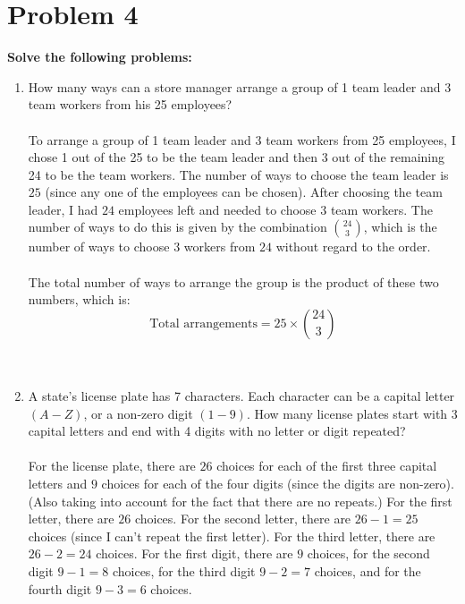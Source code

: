 \documentclass{amsart}
\theoremstyle{definition}
\theoremstyle{Exercise}
\theoremstyle{remark}
\theoremstyle{rule}
\numberwithin{equation}{section}
\begin{document}
  \section*{Problem 4}
  {\bf Solve the following problems:}
  \begin{enumerate}[label=(\alph*)]
    \item How many ways can a store manager arrange a group of 1 team leader and 3 team workers from his 25 employees?
\\\\
To arrange a group of 1 team leader and 3 team workers from 25 employees, I chose 1 out of the 25 to be the team leader and then 3 out of the remaining 24 to be the team workers. The number of ways to choose the team leader is \(25\) (since any one of the employees can be chosen). After choosing the team leader, I had \(24\) employees left and needed to choose \(3\) team workers. The number of ways to do this is given by the combination \(24 \choose 3\), which is the number of ways to choose \(3\) workers from \(24\) without regard to the order.
\\\\
The total number of ways to arrange the group is the product of these two numbers, which is:
\[
\text{Total arrangements} = 25 \times \binom{24}{3}
\]
\\\\
    \item A state’s license plate has 7 characters. Each character can be a capital letter $(A-Z)$, or a non-zero digit $(1-9)$. How many license plates start with 3 capital letters and end with 4 digits with no letter or digit repeated?
\\\\
For the license plate, there are \(26\) choices for each of the first three capital letters and \(9\) choices for each of the four digits (since the digits are non-zero). (Also taking into account for the fact that there are no repeats.) For the first letter, there are \(26\) choices. For the second letter, there are \(26 - 1 = 25\) choices (since I can't repeat the first letter). For the third letter, there are \(26 - 2 = 24\) choices. For the first digit, there are \(9\) choices, for the second digit \(9 - 1 = 8\) choices, for the third digit \(9 - 2 = 7\) choices, and for the fourth digit \(9 - 3 = 6\) choices.

\end{enumerate}
\end{document}
